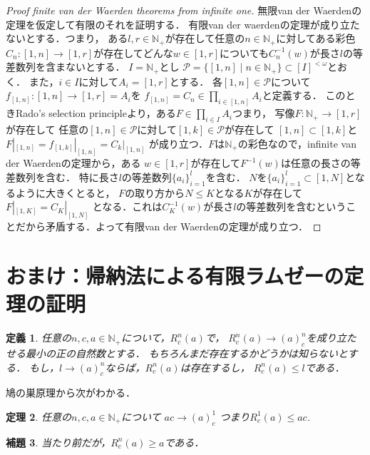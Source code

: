 \documentclass[leqno, 12pt]{jsarticle}
\newtheorem{thm}{定理}
\newtheorem{lem}[thm]{補題}
\newtheorem{df}[thm]{定義}
\newcommand{\nn}{\mathbb{N}}
\begin{document}
\begin{proof}[Proof  finite van der Waerden theorems from infinite one]
無限van der Waerdenの定理を仮定して有限のそれを証明する．
有限van der waerdenの定理が成り立たないとする．つまり，
ある$l, r\in \nn_{+}$が存在して任意の$n\in \nn_{+}$に対してある彩色$C_n: [1, n]\to [1, r]$が存在してどんな$w\in [1, r]$についても$C_n^{-1}(w)$が長さ$l$の等差数列を含まないとする．
$I=\nn_{+}$とし
$\mathcal{P}=\{[1, n]\mid n\in \nn_{+}\}\subset [I]^{<\omega}$とおく．
また，$i\in I$に対して$A_i=[1, r]$とする．
各$[1, n]\in \mathcal{P}$について
$f_{[1, n]}: [1, n]\to [1, r]=A_i$を
$f_{[1, n]}=C_n\in \prod_{i\in [1, n]}A_i$と定義する．
このときRado's selection principleより，ある$F\in \prod_{i\in I}A_i$つまり，
写像$F: \nn_{+}\to [1, r]$が存在して
任意の$[1, n]\in \mathcal{P}$に対して$[1, k]\in \mathcal{P}$が存在して
$[1, n]\subset [1,k]$と$F|_{[1, n]}=f_{[1, k]}|_{[1, n]}=C_k|_{[1, n]}$
が成り立つ．$F$は$\nn_{+}$の彩色なので，infinite van der Waerdenの定理から，ある $w\in [1, r]$が存在して$F^{-1}(w)$は任意の長さの等差数列を含む．
特に長さ$l$の等差数列$\{a_i\}_{i=1}^l$を含む．
$N$を$\{a_i\}_{i=1}^l\subset [1, N]$となるように大きくとると，
$F$の取り方から$N\le K$となる$K$が存在して$F|_{[1, K]}=C_K|_{[1, N]}$
となる．これは$C_K^{-1}(w)$が長さ$l$の等差数列を含むということだから矛盾する．よって有限van der Waerdenの定理が成り立つ．

\end{proof}



\section{ おまけ：帰納法による有限ラムゼーの定理の証明}

\begin{df}
任意の$n, c, a\in\nn_{+}$について，$R_c^n(a)$で，
$R_c^n(a)\to (a)_c^n$を成り立たせる最小の正の自然数とする．
もちろんまだ存在するかどうかは知らないとする．
もし，$l\to (a)_c^n$ならば，$R_c^n(a)$は存在するし，
$R_c^n(a)\le l$である．
\end{df}
鳩の巣原理から次がわかる．
\begin{thm}
任意の$n, c, a\in\nn_{+}$について
$ac\to (a)_c^1$
つまり$R_c^1(a)\le ac$. 
\end{thm}

\begin{lem}
当たり前だが，$R_c^n(a)\ge a$である．
\end{lem}
\end{document}
